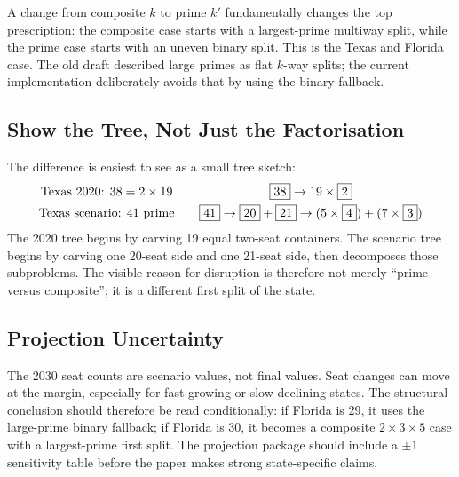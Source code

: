 A change from composite $k$ to prime $k'$ fundamentally changes the top
prescription: the composite case starts with a largest-prime multiway split,
while the prime case starts with an uneven binary split.
This is the Texas and Florida case.  The old draft described large primes as
flat $k$-way splits; the current implementation deliberately avoids that by
using the binary fallback.

\subsection{Show the Tree, Not Just the Factorisation}

The difference is easiest to see as a small tree sketch:
\[
\begin{array}{c@{\qquad}c}
\text{Texas 2020: }38=2\times 19 &
\boxed{38}\rightarrow 19\times\boxed{2}\\[0.4em]
\text{Texas scenario: }41\text{ prime} &
\boxed{41}\rightarrow \boxed{20}+\boxed{21}
       \rightarrow (5\times\boxed{4}) + (7\times\boxed{3})
\end{array}
\]
The 2020 tree begins by carving 19 equal two-seat containers.  The scenario
tree begins by carving one 20-seat side and one 21-seat side, then decomposes
those subproblems.  The visible reason for disruption is therefore not merely
``prime versus composite''; it is a different first split of the state.

\subsection{Projection Uncertainty}

The 2030 seat counts are scenario values, not final values.
Seat changes can move at the margin, especially for fast-growing or
slow-declining states.
The structural conclusion should therefore be read conditionally:
if Florida is 29, it uses the large-prime binary fallback; if Florida is 30,
it becomes a composite $2\times3\times5$ case with a largest-prime first split.
The projection package should include a $\pm1$ sensitivity table before the
paper makes strong state-specific claims.

